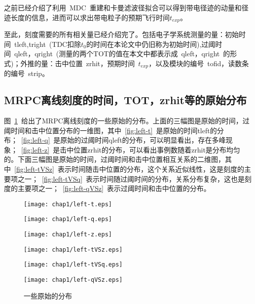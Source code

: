 之前已经介绍了利用~MDC~重建和卡曼滤波径拟合可以得到带电径迹的动量和径迹长度的信息，进而可以求出带电粒子的预期飞行时间$t_{exp}$。

至此，刻度需要的所有相关量已经介绍完了。包括电子学系统测量的量：初始时间~tleft,tright~(TDC扣除$t_{0}$的时间在本论文中仍旧称为初始时间),过阈时间~qleft，qright~(测量的两个TOT的值在本文中都表示成~qleft，qright~的形式)；外推的量：击中位置~zrhit，预期时间~$t_{exp}$，以及模块的编号~tofid，读数条的编号~strip。
\subsection{MRPC离线刻度的时间，TOT，zrhit等的原始分布}
图~\ref{fig:some-Diagram}~给出了MRPC离线刻度的一些原始的分布。上面的三幅图是原始的时间，过阈时间和击中位置分布的一维图，其中~\ref{fig:left-t}~是原始的时间tleft的分布；~\ref{fig:left-q}~是原始的过阈时间qleft的分布，可以明显看出，存在多峰现象；~\ref{fig:left-z}~是击中位置zrhit的分布，可以看出事例数随着zrhit是分布均匀的。下面三幅图是原始的时间，过阈时间和击中位置相互关系的二维图，其中~\ref{fig:left-tVSz}~表示时间随击中位置的分布，这个关系近似线性，这是刻度的主要项之一；~\ref{fig:left-tVSq}~表示时间随过阈时间的分布，关系分布复杂，这也是刻度的主要项之一；~\ref{fig:left-qVSz}~表示过阈时间和击中位置的分布。

\begin{figure}[htbp]
\begin{minipage}[t]{0.33\linewidth}
\texttt{[image: chap1/left-t.eps]}
\label{fig:left-t}
\end{minipage}%
\hfill
\begin{minipage}[t]{0.33\linewidth}
\texttt{[image: chap1/left-q.eps]}
\label{fig:left-q}
\end{minipage}
\hfill
\begin{minipage}[t]{0.33\linewidth}
\texttt{[image: chap1/left-z.eps]}
\label{fig:left-z}
\end{minipage}
\vfill
\begin{minipage}[t]{0.33\linewidth}
\texttt{[image: chap1/left-tVSz.eps]}
\label{fig:left-tVSz}
\end{minipage}%
\hfill
\begin{minipage}[t]{0.33\linewidth}
\texttt{[image: chap1/left-tVSq.eps]}
\label{fig:left-tVSq}
\end{minipage}
\hfill
\begin{minipage}[t]{0.33\linewidth}
\texttt{[image: chap1/left-qVSz.eps]}
\label{fig:left-qVSz}
\end{minipage}
\caption{一些原始的分布}
\label{fig:some-Diagram}
\end{figure}


